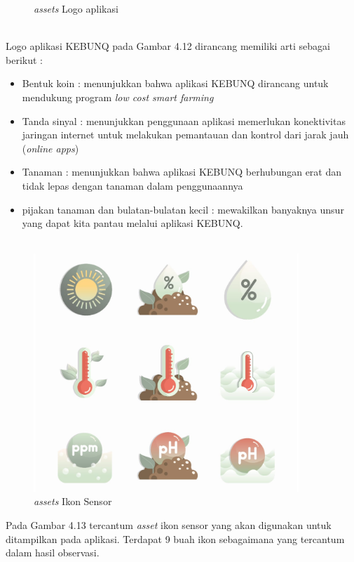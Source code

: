 \begin{flushleft}
\begin{justify}
\begin{enumerate}
\begin{figure}[ht]
                \caption{\textit{assets} Logo aplikasi}
            \end{figure}
            \noindent \\Logo aplikasi KEBUNQ pada Gambar 4.12 dirancang memiliki arti sebagai berikut :
            \begin{itemize}
                \item Bentuk koin : menunjukkan bahwa aplikasi KEBUNQ dirancang untuk mendukung program \emph{low cost smart farming}
                \item Tanda sinyal : menunjukkan penggunaan aplikasi memerlukan konektivitas jaringan internet untuk melakukan pemantauan dan kontrol dari jarak jauh (\emph{online apps})
                \item Tanaman : menunjukkan bahwa aplikasi KEBUNQ berhubungan erat dan tidak lepas dengan tanaman dalam penggunaannya
                \item pijakan tanaman dan bulatan-bulatan kecil : mewakilkan banyaknya unsur yang dapat kita pantau melalui aplikasi KEBUNQ.\\\\
            \end{itemize}
            \begin{figure}[ht]
                \centering
                \includegraphics[width=10cm]{images/UI/ikon.png}
                \caption{\textit{assets} Ikon Sensor}
            \end{figure}
            \noindent Pada Gambar 4.13 tercantum \emph{asset} ikon sensor yang akan digunakan untuk ditampilkan pada aplikasi. Terdapat 9 buah ikon sebagaimana yang tercantum dalam hasil observasi.
            \begin{figure}[ht]

\end{figure}
\end{enumerate}
\end{justify}
\end{flushleft}
